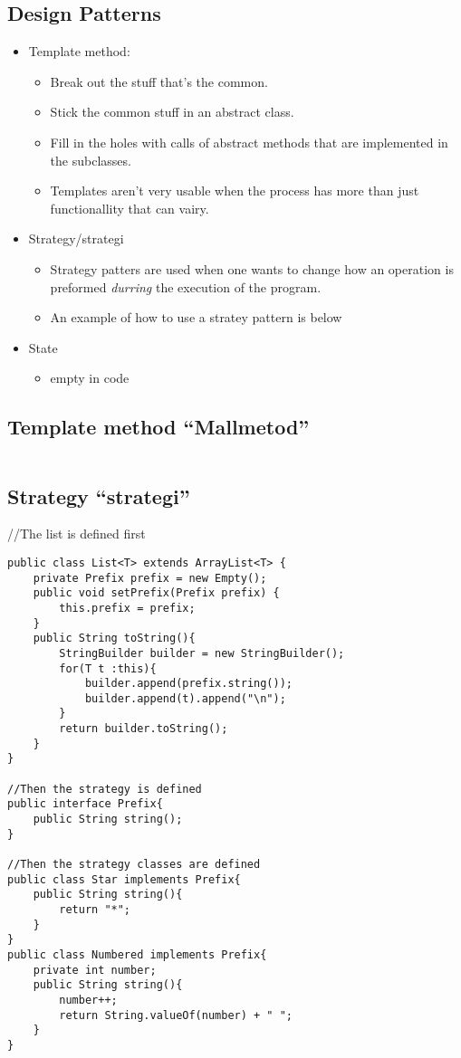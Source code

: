 \documentclass[11pt]{amsart}
\begin{document}
\subsection{Design Patterns}
\begin{itemize}
\item Template method:
	\begin{itemize}
	  \item Break out the stuff that's the common.
	  \item Stick the common stuff in an abstract class.
	  \item Fill in the holes with calls of abstract methods that are implemented
	  in the subclasses.
	  \item Templates aren't very usable when the process has more than just
	  functionallity that can vairy.
	\end{itemize}
\item Strategy/strategi
	\begin{itemize}
	  \item Strategy patters are used when one wants to change how an operation is
	  preformed \textit{durring} the execution of the program.
	  \item An example of how to use a stratey pattern is below
	\end{itemize}
\item State
	\begin{itemize}
	  \item empty in code
	\end{itemize}
\end{itemize}

\subsection{Template method ``Mallmetod''}
\begin{lstlisting}

\end{lstlisting}

\subsection{Strategy ``strategi''}
//The list is defined first
\begin{lstlisting}
public class List<T> extends ArrayList<T> { 
	private Prefix prefix = new Empty();
	public void setPrefix(Prefix prefix) {
		this.prefix = prefix;
	}
	public String toString(){
		StringBuilder builder = new StringBuilder();
		for(T t :this){
			builder.append(prefix.string());
			builder.append(t).append("\n");
		}
		return builder.toString();
	}
}

//Then the strategy is defined
public interface Prefix{
	public String string();
}

//Then the strategy classes are defined
public class Star implements Prefix{
	public String string(){
		return "*";
	}
}
public class Numbered implements Prefix{
	private int number;
	public String string(){
		number++;
		return String.valueOf(number) + " ";
	}
}
\end{lstlisting}
\end{document}
